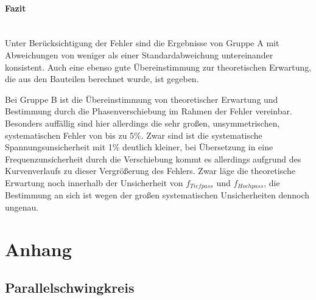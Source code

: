 \documentclass[12pt,a4paper]{article}
\begin{document}
\paragraph{Fazit} \mbox{}\\
Unter Berücksichtigung der Fehler sind die Ergebnisse von Gruppe A mit Abweichungen von weniger als einer Standardabweichung untereinander konsistent. Auch eine ebenso gute Übereinstimmung zur theoretischen Erwartung, die aus den Bauteilen berechnet wurde, ist gegeben.

Bei Gruppe B ist die Übereinstimmung von theoretischer Erwartung und Bestimmung durch die Phasenverschiebung im Rahmen der Fehler vereinbar. Besonders auffällig sind hier allerdings die sehr großen, unsymmetrischen, systematischen Fehler von bis zu 5\%. Zwar sind ist die systematische Spannungsunsicherheit mit 1\% deutlich kleiner, bei Übersetzung in eine Frequenzunsicherheit durch die Verschiebung kommt es allerdings aufgrund des Kurvenverlaufs zu dieser Vergrößerung des Fehlers. Zwar läge die theoretische Erwartung noch innerhalb der Unsicherheit von $f_{Tiefpass}$ und $f_{Hochpass}$, die Bestimmung an sich ist wegen der großen systematischen Unsicherheiten dennoch ungenau.

\newpage
\section{Anhang}

\subsection{Parallelschwingkreis}
\end{document}
